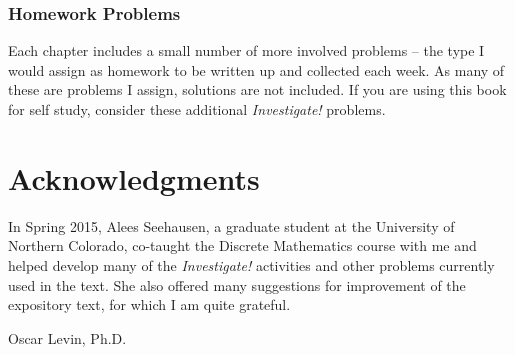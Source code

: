 \subsubsection*{Homework Problems} 

Each chapter includes a small number of more involved problems -- the type I would assign as homework to be written up and collected each week.  As many of these are problems I assign, solutions are not included.  If you are using this book for self study, consider these additional \emph{Investigate!} problems.

\section*{Acknowledgments}


In Spring 2015, Alees Seehausen, a graduate student at the University of Northern Colorado, co-taught the Discrete Mathematics course with me and helped develop many of the \emph{Investigate!} activities  and other problems currently used in the text.  She also offered many suggestions for improvement of the expository text, for which I am quite grateful.


\begin{flushright}
Oscar Levin, Ph.D.
\end{flushright}
\newpage